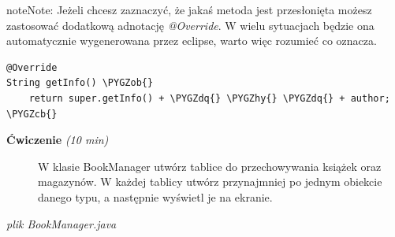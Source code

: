 \documentclass[letterpaper,10pt,english]{sphinxmanual}
\def\PYGZob{\char`\{}
\def\PYGZcb{\char`\}}
\def\PYGZhy{\char`\-}
\def\PYGZdq{\char`\"}
\begin{document}
\begin{notice}{note}{Note:}
Jeżeli chcesz zaznaczyć, że jakaś metoda jest przesłonięta możesz zastosować dodatkową adnotację \emph{@Override}. W wielu sytuacjach będzie ona automatycznie wygenerowana przez eclipse, warto więc rozumieć co oznacza.

\begin{Verbatim}[commandchars=\\\{\}]
@Override
String getInfo() \PYGZob{}
    return super.getInfo() + \PYGZdq{} \PYGZhy{} \PYGZdq{} + author;
\PYGZcb{}
\end{Verbatim}
\end{notice}
\begin{description}
\item[{\textbf{Ćwiczenie} \emph{(10 min)}}] \leavevmode
W klasie BookManager utwórz tablice do przechowywania książek oraz magazynów. W każdej tablicy utwórz przynajmniej po jednym obiekcie danego typu, a następnie wyświetl je na ekranie.

\end{description}

\emph{plik BookManager.java}
\end{document}
